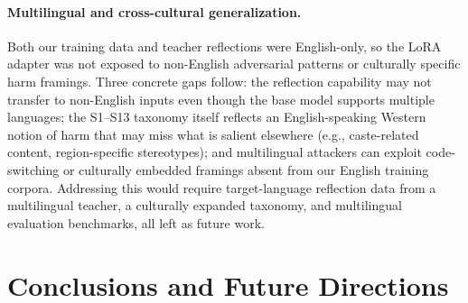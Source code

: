 \documentclass[superintelligence,article,accept,moreauthors]{Definitions/mdpi}
\renewcommand{\hl}[1]{#1}
\begin{document}
\paragraph{\hl{Multilingual and cross-cultural generalization.}}
Both our training data and teacher reflections were English-only, so the LoRA adapter was not exposed to non-English adversarial patterns or culturally specific harm framings. Three concrete gaps follow: the reflection capability may not transfer to non-English inputs even though the base model supports multiple languages; the S1--S13 taxonomy itself reflects an English-speaking Western notion of harm that may miss what is salient elsewhere (e.g., caste-related content, region-specific stereotypes); and multilingual attackers can exploit code-switching or culturally embedded framings absent from our English training corpora. Addressing this would require target-language reflection data from a multilingual teacher, a culturally expanded taxonomy, and multilingual evaluation benchmarks, all left as future work.

\section{Conclusions and Future Directions}
\end{document}
